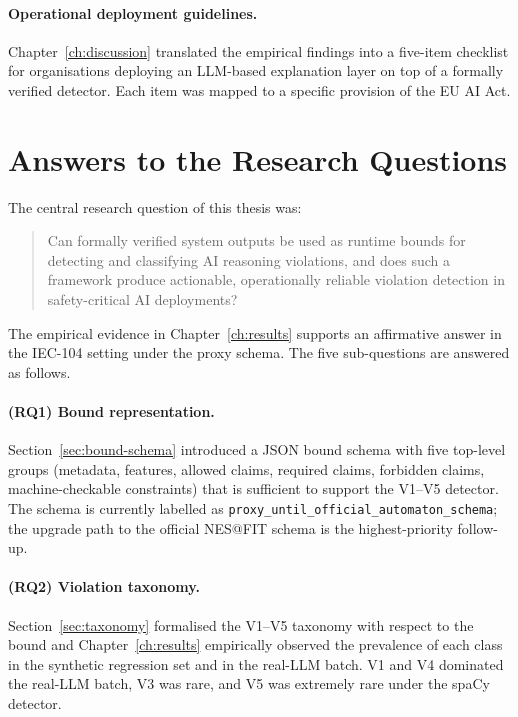 \paragraph{Operational deployment guidelines.}
Chapter~\ref{ch:discussion} translated the empirical findings into a
five-item checklist for organisations deploying an LLM-based explanation
layer on top of a formally verified detector. Each item was mapped to a
specific provision of the EU AI Act.

\section{Answers to the Research Questions}
\label{sec:conclusion-answers}

The central research question of this thesis was:

\begin{quote}
  Can formally verified system outputs be used as runtime bounds for
  detecting and classifying AI reasoning violations, and does such a
  framework produce actionable, operationally reliable violation
  detection in safety-critical AI deployments?
\end{quote}

The empirical evidence in Chapter~\ref{ch:results} supports an affirmative
answer in the IEC-104 setting under the proxy schema. The five
sub-questions are answered as follows.

\paragraph{(RQ1) Bound representation.}
Section~\ref{sec:bound-schema} introduced a JSON bound schema with five
top-level groups (metadata, features, allowed claims, required claims,
forbidden claims, machine-checkable constraints) that is sufficient to
support the V1--V5 detector. The schema is currently labelled as
\texttt{proxy\_until\_official\_automaton\_schema}; the upgrade path to
the official NES@FIT schema is the highest-priority follow-up.

\paragraph{(RQ2) Violation taxonomy.}
Section~\ref{sec:taxonomy} formalised the V1--V5 taxonomy with respect to
the bound and Chapter~\ref{ch:results} empirically observed the
prevalence of each class in the synthetic regression set and in the
real-LLM batch. V1 and V4 dominated the real-LLM batch, V3 was rare, and
V5 was extremely rare under the spaCy detector.

